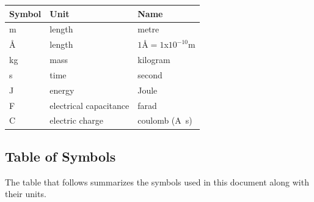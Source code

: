 \documentclass[12pt]{article}
\begin{document}
\renewcommand{\arraystretch}{1.2}
  \noindent \begin{tabular}{l l l} 
    \toprule		
    \textbf{Symbol} & \textbf{Unit} & \textbf{Name}\\
    \midrule 
    \si{\metre} & length & metre\\
    \si{\angstrom} & length & $1\si{\angstrom} = 1$x$10^{-10}$\si{\metre} \\
    \si{\kilogram} & mass	& kilogram\\
    \si{\second} & time & second\\
    \si{\joule} & energy & Joule\\
    \si{\farad} & electrical capacitance & farad \\
    \si{\coulomb} & electric charge & coulomb (\si{\ampere\second}) \\
    \bottomrule
  \end{tabular}



\subsection{Table of Symbols}

The table that follows summarizes the symbols used in this document along with
their units.
\end{document}
